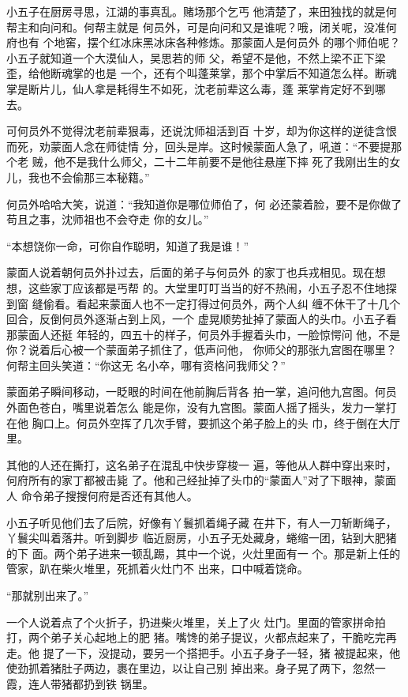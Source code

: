 小五子在厨房寻思，江湖的事真乱。赌场那个乞丐
他清楚了，来田独找的就是何帮主和向问和。何帮主就是
何员外，可是向问和又是谁呢？哦，闭关呢，没准何府也有
个地窖，摆个红冰床黑冰床各种修炼。那蒙面人是何员外
的哪个师伯呢？小五子就知道一个大漠仙人，吴思若的师
父，希望不是他，不然上梁不正下梁歪，给他断魂掌的也是
一个，还有个叫蓬莱掌，那个中掌后不知道怎么样。断魂
掌是断片儿，仙人拿是耗得生不如死，沈老前辈这么毒，蓬
莱掌肯定好不到哪去。

可何员外不觉得沈老前辈狠毒，还说沈师祖活到百
十岁，却为你这样的逆徒含恨而死，劝蒙面人念在师徒情
分，回头是岸。这时候蒙面人急了，吼道：“不要提那个老
贼，他不是我什么师父，二十二年前要不是他往悬崖下摔
死了我刚出生的女儿，我也不会偷那三本秘籍。”

何员外哈哈大笑，说道：“我知道你是哪位师伯了，何
必还蒙着脸，要不是你做了苟且之事，沈师祖也不会夺走
你的女儿。”

“本想饶你一命，可你自作聪明，知道了我是谁！”

蒙面人说着朝何员外扑过去，后面的弟子与何员外
的家丁也兵戎相见。现在想想，这些家丁应该都是丐帮
的。大堂里叮叮当当的好不热闹，小五子忍不住地探到窗
缝偷看。看起来蒙面人也不一定打得过何员外，两个人纠
缠不休干了十几个回合，反倒何员外逐渐占到上风，一个
虚晃顺势扯掉了蒙面人的头巾。小五子看那蒙面人还挺
年轻的，四五十的样子，何员外手握着头巾，一脸惊愕问
他，不是你？说着后心被一个蒙面弟子抓住了，低声问他，
你师父的那张九宫图在哪里？何帮主回头笑道：“你这无
名小卒，哪有资格问我师父？”

蒙面弟子瞬间移动，一眨眼的时间在他前胸后背各
拍一掌，追问他九宫图。何员外面色苍白，嘴里说着怎么
能是你，没有九宫图。蒙面人摇了摇头，发力一掌打在他
胸口上。何员外空挥了几次手臂，要抓这个弟子脸上的头
巾，终于倒在大厅里。

其他的人还在撕打，这名弟子在混乱中快步穿梭一
遍，等他从人群中穿出来时，何府所有的家丁都被击毙
了。他和己经扯掉了头巾的“蒙面人”对了下眼神，蒙面人
命令弟子搜搜何府是否还有其他人。

小五子听见他们去了后院，好像有丫鬟抓着绳子藏
在井下，有人一刀斩断绳子，丫鬟尖叫着落井。听到脚步
临近厨房，小五子无处藏身，蜷缩一团，钻到大肥猪的下
面。两个弟子进来一顿乱踢，其中一个说，火灶里面有一
个。那是新上任的管家，趴在柴火堆里，死抓着火灶门不
出来，口中喊着饶命。

“那就别出来了。”

一个人说着点了个火折子，扔进柴火堆里，关上了火
灶门。里面的管家拼命拍打，两个弟子关心起地上的肥
猪。嘴馋的弟子提议，火都点起来了，干脆吃完再走。他
提了一下，没提动，要另一个搭把手。小五子身子一轻，猪
被提起来，他使劲抓着猪肚子两边，裹在里边，以让自己别
掉出来。身子晃了两下，忽然一霞，连人带猪都扔到铁
锅里。

